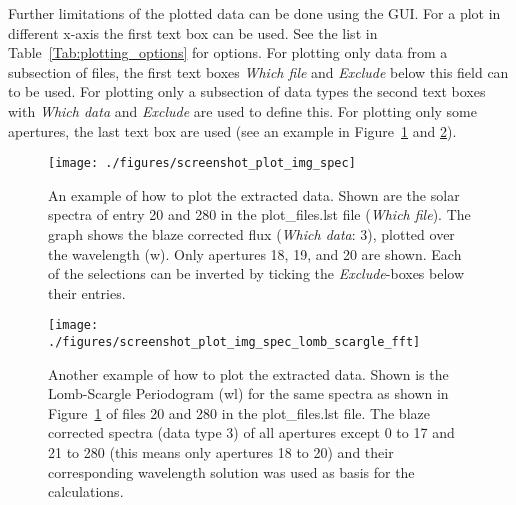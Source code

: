 \documentclass[10pt,a4paper]{article}
\begin{document}
Further limitations of the plotted data can be done using the GUI. For a plot in different x-axis the first text box can be used. See the list in Table~\ref{Tab:plotting_options} for options. For plotting only data from a subsection of files, the first text boxes \textit{Which file} and \textit{Exclude} below this field can to be used. For plotting only a subsection of data types the second text boxes with \textit{Which data} and \textit{Exclude} are used to define this. For plotting only some apertures, the last text box are used (see an example in Figure~\ref{figure_plotting_results_example1} and \ref{figure_plotting_results_example2}).

\begin{figure} 
  \begin{center}
    \texttt{[image: ./figures/screenshot\_plot\_img\_spec]}
  \end{center} 
  \caption{An example of how to plot the extracted data. Shown are the solar spectra of entry 20 and 280 in the plot\_files.lst file (\textit{Which file}). The graph shows the blaze corrected flux (\textit{Which data}: 3), plotted over the wavelength (w). Only apertures 18, 19, and 20 are shown. Each of the selections can be inverted by ticking the \textit{Exclude}-boxes below their entries.
    \label{figure_plotting_results_example1}}
\end{figure}

\begin{figure} 
  \begin{center}
    \texttt{[image: ./figures/screenshot\_plot\_img\_spec\_lomb\_scargle\_fft]}
  \end{center} 
  \caption{Another example of how to plot the extracted data. Shown is the Lomb-Scargle Periodogram (wl) for the same spectra as shown in Figure~\ref{figure_plotting_results_example1} of files 20 and 280 in the plot\_files.lst file. The blaze corrected spectra (data type 3) of all apertures except 0 to 17 and 21 to 280 (this means only apertures 18 to 20) and their corresponding wavelength solution was used as basis for the calculations.
    \label{figure_plotting_results_example2}}
\end{figure}
\end{document}
